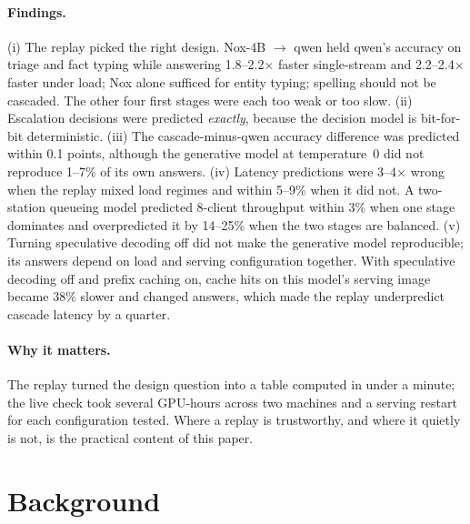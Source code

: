 \documentclass[11pt]{article}
\begin{document}
\paragraph{Findings.} (i) The replay picked the right design. Nox-4B $\rightarrow$ qwen held qwen's
accuracy on triage and fact typing while answering 1.8--2.2$\times$ faster single-stream and
2.2--2.4$\times$ faster under load; Nox alone sufficed for entity typing; spelling should not be
cascaded. The other four first stages were each too weak or too slow. (ii) Escalation decisions were
predicted \emph{exactly}, because the decision model is bit-for-bit deterministic. (iii) The
cascade-minus-qwen accuracy difference was predicted within 0.1 points, although the generative
model at temperature~0 did not reproduce 1--7\% of its own answers. (iv) Latency predictions were
3--4$\times$ wrong when the replay mixed load regimes and within 5--9\% when it did not. A
two-station queueing model predicted 8-client throughput within 3\% when one stage dominates and
overpredicted it by 14--25\% when the two stages are balanced. (v) Turning speculative decoding off
did not make the generative model reproducible; its answers depend on load and serving configuration
together. With speculative decoding off and prefix caching on, cache hits on this model's serving image
became 38\% slower and changed answers, which made the replay underpredict cascade latency by a
quarter.

\paragraph{Why it matters.} The replay turned the design question into a table computed in under a
minute; the live check took several GPU-hours across two machines and a serving restart for each
configuration tested. Where a replay is trustworthy, and where it quietly is not, is the practical
content of this paper.

\section{Background}
\end{document}

